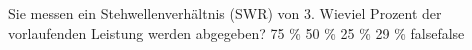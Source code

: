     {Sie messen ein Stehwellenverhältnis (SWR) von 3. Wieviel Prozent der vorlaufenden Leistung werden abgegeben?}
    {75 \%}
    {50 \%}
    {25 \%}
    {29 \%}
    {false}{false}